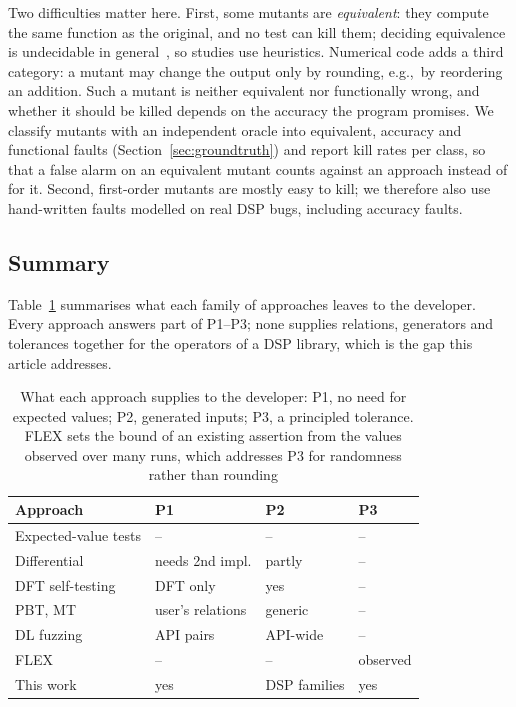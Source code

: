 \documentclass[10pt,conference]{IEEEtran}
\newcommand{\eg}{e.g.,\ }
\begin{document}
Two difficulties matter here. First, some mutants are \emph{equivalent}: they
compute the same function as the original, and no test can kill them; deciding
equivalence is undecidable in general~\cite{jia2011mutation}, so studies use
heuristics. Numerical code adds a third category: a mutant may change the
output only by rounding, \eg by reordering an addition. Such a mutant is
neither equivalent nor functionally wrong, and whether it should be killed
depends on the accuracy the program promises. We classify mutants with an
independent oracle into equivalent, accuracy and functional faults
(Section~\ref{sec:groundtruth}) and report kill rates per class, so that a
false alarm on an equivalent mutant counts against an approach instead of for
it. Second, first-order mutants are mostly easy to kill; we therefore also use
hand-written faults modelled on real DSP bugs, including accuracy faults.

\subsection{Summary}
Table~\ref{tab:positioning} summarises what each family of approaches leaves to
the developer. Every approach answers part of P1--P3; none supplies relations,
generators and tolerances together for the operators of a DSP library, which is
the gap this article addresses.

\begin{table}[t]
\caption{What each approach supplies to the developer: P1, no need for expected values; P2, generated inputs; P3, a principled tolerance. FLEX sets the bound of an existing assertion from the values observed over many runs, which addresses P3 for randomness rather than rounding}
\label{tab:positioning}
\centering\scriptsize
\begin{tabular}{@{}llll@{}}
\toprule
Approach & P1 & P2 & P3 \\
\midrule
Expected-value tests & -- & -- & -- \\
Differential~\cite{vanover2020fpdiff} & needs 2nd impl. & partly & -- \\
DFT self-testing~\cite{ergun1995testing,fftwverify} & DFT only & yes & -- \\
PBT, MT~\cite{maciver2019hypothesis,chen2018metamorphic} & user's relations & generic & -- \\
DL fuzzing~\cite{wei2022freefuzz,deng2022deeprel} & API pairs & API-wide & -- \\
FLEX~\cite{dutta2021flex} & -- & -- & observed \\
This work & yes & DSP families & yes \\
\bottomrule
\end{tabular}
\end{table}
\end{document}
